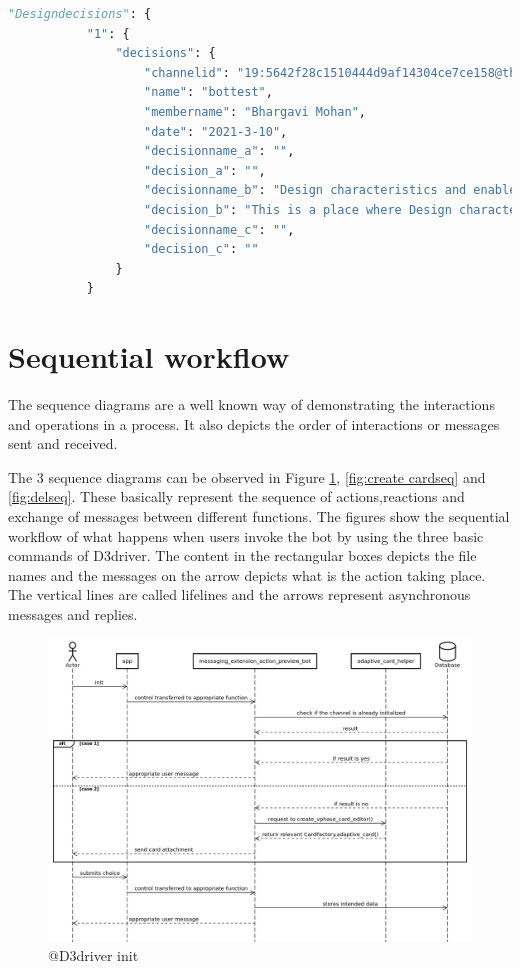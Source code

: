 \begin{enumerate}
\begin{lstlisting}[caption={Design decisions table},label={lst:des},language=python]
   "Designdecisions": {
           "1": {
               "decisions": {
                   "channelid": "19:5642f28c1510444d9af14304ce7ce158@thread.tacv2",
                   "name": "bottest",
                   "membername": "Bhargavi Mohan",
                   "date": "2021-3-10",
                   "decisionname_a": "",
                   "decision_a": "",
                   "decisionname_b": "Design characteristics and enablers desicions",
                   "decision_b": "This is a place where Design characteristics and enablers desicions will be discussed",
                   "decisionname_c": "",
                   "decision_c": ""
               }
           }
\end{lstlisting}
\end{enumerate}

\section{Sequential workflow}
The sequence diagrams are a well known way of demonstrating the interactions and operations in a process. It also depicts the order of interactions or messages sent and received. 

The 3 sequence diagrams can be observed in Figure \ref{fig:initseq},  \ref{fig:create cardseq} and \ref{fig:delseq}. These basically represent the sequence of actions,reactions and exchange of messages between different functions. The figures show the sequential workflow of what happens when users invoke the bot by using the three basic commands of D3driver. The content in the rectangular boxes depicts the file names and the messages on the arrow depicts what is the action taking place. The vertical lines are called lifelines and the arrows represent asynchronous messages and replies. 



\begin{figure}[h]
\centering
\includegraphics[width=1.1\linewidth]{figures/initseq}
\captionsetup{justification=centering}
\caption{@D3driver init}
\label{fig:initseq}
\end{figure}

